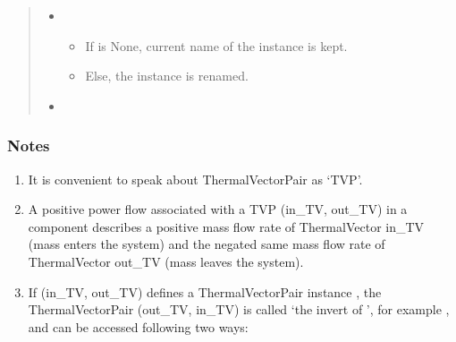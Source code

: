 \documentclass[letterpaper,10pt,english]{sphinxmanual}
\begin{document}
\begin{fulllineitems}
\begin{quote}
\begin{description}
\begin{itemize}
\end{itemize}

\sphinxAtStartPar
\begin{itemize}
\item {} 
\sphinxAtStartPar
{} \textendash{}
\begin{itemize}
\item {} 
\sphinxAtStartPar
If  is None, current name of the instance is kept.

\item {} 
\sphinxAtStartPar
Else, the instance is renamed.

\end{itemize}

\item {} 
\sphinxAtStartPar
{}

\end{itemize}


\end{description}\end{quote}
\subsubsection*{Notes}
\begin{enumerate}
%
\item {} 
\sphinxAtStartPar
It is convenient to speak about ThermalVectorPair as ‘TVP’.

\item {} 
\sphinxAtStartPar
A positive power flow associated with a TVP (in\_TV, out\_TV) in a component describes
a positive mass flow rate of ThermalVector in\_TV (mass enters the system)
and the negated same mass flow rate of ThermalVector out\_TV (mass leaves the system).

\item {} 
\sphinxAtStartPar
If (in\_TV, out\_TV) defines a ThermalVectorPair instance , the ThermalVectorPair (out\_TV, in\_TV) is called
‘the invert of ’, for example , and can be accessed following two ways:

\begin{sphinxVerbatim}[commandchars=\\\{\}]
   
  
  
\end{sphinxVerbatim}


\end{enumerate}
\end{fulllineitems}
\end{document}
